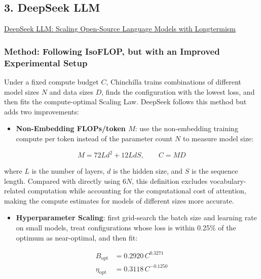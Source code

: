 \documentclass[
  english,
  11pt,
  a4paper,
]{article}
\providecommand{\tightlist}{%
  \setlength{\itemsep}{0pt}\setlength{\parskip}{0pt}}
\begin{document}
\clearpage

\subsection{3. DeepSeek LLM}\label{deepseek-llm}

\href{https://arxiv.org/abs/2401.02954}{DeepSeek LLM: Scaling
Open-Source Language Models with Longtermism}

\subsubsection{Method: Following IsoFLOP, but with an Improved
Experimental
Setup}\label{method-following-isoflop-but-with-an-improved-experimental-setup}

Under a fixed compute budget \(C\), Chinchilla trains combinations of
different model sizes \(N\) and data sizes \(D\), finds the
configuration with the lowest loss, and then fits the compute-optimal
Scaling Law. DeepSeek follows this method but adds two improvements:

\begin{itemize}
\tightlist
\item
  \textbf{Non-Embedding FLOPs/token \(M\)}: use the non-embedding
  training compute per token instead of the parameter count \(N\) to
  measure model size:
\end{itemize}

\[M=72Ld^2+12LdS,\qquad C=MD\]

where \(L\) is the number of layers, \(d\) is the hidden size, and \(S\)
is the sequence length. Compared with directly using \(6N\), this
definition excludes vocabulary-related computation while accounting for
the computational cost of attention, making the compute estimates for
models of different sizes more accurate.

\begin{itemize}
\tightlist
\item
  \textbf{Hyperparameter Scaling}: first grid-search the batch size and
  learning rate on small models, treat configurations whose loss is
  within 0.25\% of the optimum as near-optimal, and then fit:
\end{itemize}

\[\boxed{
\begin{aligned}
B_{\mathrm{opt}}&=0.2920\,C^{0.3271}\\
\eta_{\mathrm{opt}}&=0.3118\,C^{-0.1250}
\end{aligned}}\]
\end{document}
